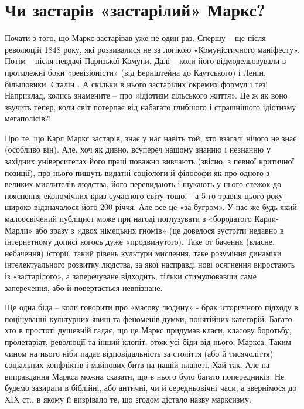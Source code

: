 \documentclass{kapital}
\begin{document}
\section*{Чи  застарів «застарілий» Маркс?}

 

 
	Почати з того, що Маркс застарівав уже не один раз. Спершу – ще після революцій 1848 року, які розвивалися не за логікою «Комуністичного маніфесту».	Потім – після невдачі Паризької Комуни. Далі – коли його відмодельовували в протилежні боки «ревізіоністи» (від Бернштейна до Каутського) і Ленін, більшовики, Сталін… А скільки в нього застарілих окремих формул і тез! Наприклад, колись знамените – про «ідіотизм сільського життя». Це ж як воно звучить тепер, коли світ потерпає від набагато глибшого і страшнішого ідіотизму мегаполісів?!    
 
      Про те, що Карл Маркс застарів, знає у нас навіть той, хто взагалі нічого не знає (особливо він). Але, хоч як дивно,  всупереч нашому знанню і незнанню у західних університетах його праці поважно вивчають (звісно, з певної критичної позиції),  про нього пишуть видатні соціологи й філософи як про одного з великих мислителів людства, його перевидають і шукають у нього стежок до пояснення економічних криз сучасного світу  тощо, - а 5-го травня цього року широко відзначалося його 200-річчя. Але все це «за бугром». У нас же будь-який малоосвічений публіцист може при нагоді поглузувати з «бородатого Карли-Марли» або зразу з «двох німецьких гномів» (це довелося зустріти недавно в інтернетному дописі когось дуже «продвинутого). Таке от бачення (власне, небачення) історії, такий рівень культури мислення, таке розуміння динаміки інтелектуального розвитку людства, за якої насправді нові осягнення виростають із «застарілого», а заперечуване відходить, тільки стимулювавши саме заперечення, або й повертається невпізнане.
 
	Ще одна біда – коли говорити про «масову людину» - брак історичного підходу в поцінуванні культурних явищ та феноменів думки, понятійних категорій. Багато хто в простоті душевній гадає, що це Маркс придумав класи, класову боротьбу, пролетаріат, революції та інший клопіт, отож усі біди від нього, Маркса. Таким чином на нього ніби падає відповідальність за століття (або й тисячоліття)  соціальних конфліктів і майнових битв на нашій планеті. Хай так. Але на виправдання Маркса можна сказати, що в нього було багато попередників. Не будемо зазирати в біблійні, або античні, чи й середньовічні  часи, а звернімося до ХIХ ст., в якому й визрівало  те, що згодом дістало назву марксизму.
 
\end{document}
